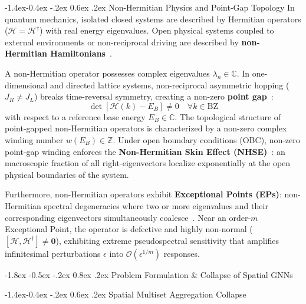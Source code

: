 \documentclass[10pt,twocolumn,letterpaper]{article}
\makeatletter
\renewcommand\section{\@startsection {section}{1}{\z@}%
                                   {-1.8ex \@plus -0.5ex \@minus -.2ex}%
                                   {0.8ex \@plus .2ex}%
                                   {\normalfont\large\bfseries}}
\renewcommand\subsection{\@startsection{subsection}{2}{\z@}%
                                     {-1.4ex\@plus -0.4ex \@minus -.2ex}%
                                     {0.6ex \@plus .2ex}%
                                     {\normalfont\normalsize\bfseries}}
\makeatother
\begin{document}
\subsection{Non-Hermitian Physics and Point-Gap Topology}
In quantum mechanics, isolated closed systems are described by Hermitian operators ($\mathcal{H} = \mathcal{H}^\dagger$) with real energy eigenvalues. Open physical systems coupled to external environments or non-reciprocal driving are described by \textbf{non-Hermitian Hamiltonians}~\cite{hatano1996localization, gong2018topological, ashida2020nonhermitian}.

A non-Hermitian operator possesses complex eigenvalues $\lambda_n \in \mathbb{C}$. In one-dimensional and directed lattice systems, non-reciprocal asymmetric hopping ($J_{R} \ne J_{L}$) breaks time-reversal symmetry, creating a non-zero \textbf{point gap}~\cite{kawabata2019symmetry}:
\begin{equation}
\det[\mathcal{H}(k) - E_B] \ne 0 \quad \forall k \in \mathrm{BZ}
\end{equation}
with respect to a reference base energy $E_B \in \mathbb{C}$. The topological structure of point-gapped non-Hermitian operators is characterized by a non-zero complex winding number $w(E_B) \in \mathbb{Z}$. Under open boundary conditions (OBC), non-zero point-gap winding enforces the \textbf{Non-Hermitian Skin Effect (NHSE)}~\cite{yao2018edge, bergholtz2021exceptional}: an macroscopic fraction of all right-eigenvectors localize exponentially at the open physical boundaries of the system.

Furthermore, non-Hermitian operators exhibit \textbf{Exceptional Points (EPs)}: non-Hermitian spectral degeneracies where two or more eigenvalues and their corresponding eigenvectors simultaneously coalesce~\cite{bergholtz2021exceptional, trefethen2005spectra}. Near an order-$m$ Exceptional Point, the operator is defective and highly non-normal ($[\mathcal{H}, \mathcal{H}^\dagger] \ne \mathbf{0}$), exhibiting extreme pseudospectral sensitivity that amplifies infinitesimal perturbations $\epsilon$ into $\mathcal{O}(\epsilon^{1/m})$ responses.

\section{Problem Formulation \& Collapse of Spatial GNNs}
\label{sec:theory}

\subsection{Spatial Multiset Aggregation Collapse}
\end{document}
